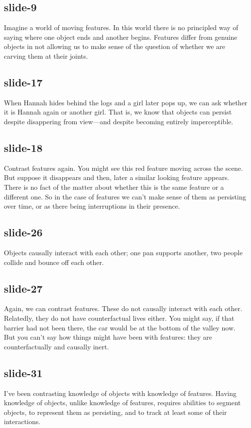 \documentclass[12pt,\papersize]{extarticle}
\begin{document}
 
\subsection{slide-9}
Imagine a world of moving features. In this world there is no principled way of saying where one object ends and another begins.
Features differ from genuine objects in not allowing us to make sense of the question of whether we are carving them at their joints.
 
 
\subsection{slide-17}
When Hannah hides behind the logs and a girl later pops up, we can ask whether it is Hannah again or another girl.
That is, we know that objects can persist despite disappering from view---and despite becoming entirely imperceptible.
 
 
\subsection{slide-18}
Contrast features again. You might see this red feature moving across the scene. But suppose it disappears and then, later a similar looking feature appears. There is no fact of the matter about whether this is the same feature or a different one.
So in the case of features we can't make sense of them as persisting over time, or as there being interruptions in their presence.
 
 
\subsection{slide-26}
Objects causally interact with each other; one pan supports another, two people collide and bounce off each other.
 
 
\subsection{slide-27}
Again, we can contrast features. These do not causally interact with each other.
Relatedly, they do not have counterfactual lives either.
You might say, if that barrier had not been there, the car would be at the bottom of the valley now.
But you can't say how things might have been with features: they are counterfactually and causally inert.
 
 
\subsection{slide-31}
I've been contrasting knowledge of objects with knowledge of features.
Having knowledge of objects, unlike knowledge of features, requires abilities to segment objects, to represent them as persisting, and to track at least some of their interactions.
 
\end{document}
